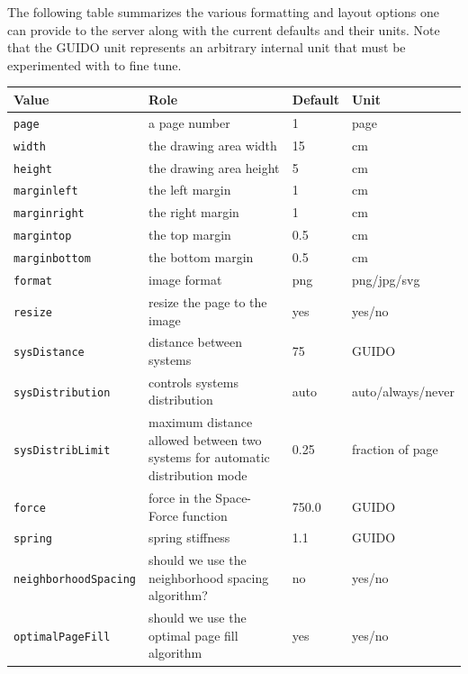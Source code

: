 \documentclass{article}
\begin{document}
The following table summarizes the various formatting and layout options one can provide to the server along with the current defaults and their units.  Note that the GUIDO unit represents an arbitrary internal unit that must be experimented with to fine tune.\par
\begin{longtable}{|l|p{4cm}|l|l|}\hline
Value & Role & Default & Unit \\\hline
\verb=page= & a page number & 1 & page \\\hline
\verb=width= & the drawing area width & 15 & cm \\\hline
\verb=height= & the drawing area height & 5 & cm \\\hline
\verb=marginleft= & the left margin & 1 & cm \\\hline
\verb=marginright= & the right margin & 1 & cm \\\hline
\verb=margintop= & the top margin & 0.5 & cm \\\hline
\verb=marginbottom= & the bottom margin & 0.5 & cm \\\hline
\verb=format= & image format & png & png/jpg/svg \\\hline
\verb=resize= & resize the page to the image & yes & yes/no \\\hline
\verb=sysDistance= & distance between systems & 75 & GUIDO \\\hline
\verb=sysDistribution= & controls systems distribution & auto & auto/always/never\\\hline
\verb=sysDistribLimit= & maximum distance allowed between two systems for automatic distribution mode & 0.25 & fraction of page \\\hline
\verb=force= & force in the Space-Force function & 750.0 & GUIDO \\\hline
\verb=spring= & spring stiffness & 1.1 & GUIDO \\\hline
\verb=neighborhoodSpacing= & should we use the neighborhood spacing algorithm? & no & yes/no \\\hline
\verb=optimalPageFill= & should we use the optimal page fill algorithm & yes & yes/no\\\hline
\end{longtable}
\end{document}
